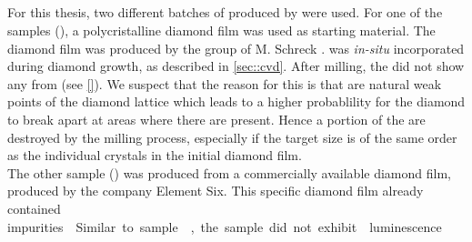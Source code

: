 	\subsection{\BASD \Nds}\label{subsec::basd_nds}
	For this thesis, two different batches of \nds produced by \basd were used.
	For one of the samples (\basds), a polycristalline diamond film was used as starting material.
	The diamond film was produced by the group of M. Schreck \cite{}.
	\Si was \textit{in-situ} incorporated during diamond growth, as described in \autoref{sec::cvd}.
	After milling, the \nds did not show any \pl from \sivs (see \autoref{}).
	We suspect that the reason for this is that \sivs are natural weak points of the diamond lattice which leads to a higher probablility for the diamond to break apart at areas where there are \sivs present.
	Hence a portion of the \sivs are destroyed by the milling process, especially if the target \nd size is of the same order as the individual crystals in the initial diamond film.
	\\
	The other sample (\basdes) was produced from a commercially available diamond film, produced by the company Element Six.
	This specific diamond film already contained \si impurities.
	Similar to sample \basds, the sample did not exhibit \siv luminescence.
	\\
